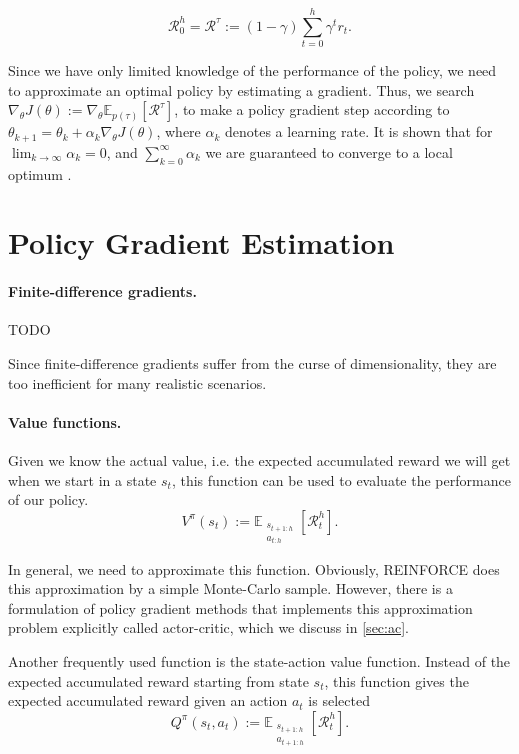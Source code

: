 \begin{equation}
  \mathcal{R}_0^h = \mathcal{R}^\tau := (1-\gamma) \sum_{t=0}^{h} \gamma^t r_t.
  \label{eqn:acc-reward}
\end{equation}

Since we have only limited knowledge of the performance of the policy, we need to approximate an optimal policy by estimating a gradient. 
Thus, we search $\nabla_\theta J(\theta) := \nabla_\theta \mathbb{E}_{p(\tau)}\left[\mathcal{R}^\tau\right]$, to make a policy gradient step according to $\theta_{k+1} = \theta_k + \alpha_k \nabla_\theta J(\theta)$, where $\alpha_k$ denotes a learning rate. 
It is shown that for $\lim_{k\to\infty}\alpha_k = 0$, and $\sum_{k=0}^\infty \alpha_k$ we are guaranteed to converge to a local optimum \cite{Sutton:1999:PGM:3009657.3009806}.

\section{Policy Gradient Estimation}
\label{sec:pge}

\paragraph{Finite-difference gradients.} TODO

Since finite-difference gradients suffer from the curse of dimensionality, they are too inefficient for many realistic scenarios. 

\paragraph{Value functions.} 
Given we know the actual value, i.e. the expected accumulated reward we will get when we start in a state $s_t$, this function can be used to evaluate the performance of our policy.
\begin{equation}
	V^{\pi}(s_t) := \mathbb{E}_{\substack{s_{t+1:h} \\ a_{t:h}}}\left[\mathcal{R}_t^h\right].
	\label{eqn:v}
\end{equation}

In general, we need to approximate this function. 
Obviously, REINFORCE does this approximation by a simple Monte-Carlo sample. 
However, there is a formulation of policy gradient methods that implements this approximation problem explicitly called actor-critic, which we discuss in \ref{sec:ac}. 

Another frequently used function is the state-action value function. 
Instead of the expected accumulated reward starting from state $s_t$, this function gives the expected accumulated reward given an action $a_t$ is selected
\begin{equation}
	Q^{\pi}(s_t, a_t) := \mathbb{E}_{\substack{s_{t+1:h} \\ a_{t+1:h}}}\left[\mathcal{R}_t^h\right].
	\label{eqn:q}
\end{equation}

